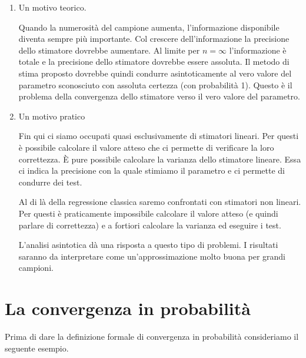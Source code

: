 \documentclass[a4paper]{report}
\newcounter{ese}
\newcounter{def}
\theoremstyle{remark}
\begin{document}
\begin{enumerate}
\item Un motivo teorico.

Quando la numerosit\`{a} del campione aumenta, l'informazione disponibile
diventa sempre pi\`{u} importante. Col crescere dell'informazione la
precisione dello stimatore dovrebbe aumentare. Al limite per $n=\infty $
l'informazione \`{e} totale e la precisione dello stimatore dovrebbe essere
assoluta. Il metodo di stima proposto dovrebbe quindi condurre
asintoticamente al vero valore del parametro sconosciuto con assoluta
certezza (con probabilit\`{a} 1). Questo \`{e} il problema della convergenza
dello stimatore verso il vero valore del parametro.

\item Un motivo pratico

Fin qui ci siamo occupati quasi esclusivamente di stimatori lineari. Per
questi \`{e} possibile calcolare il valore atteso che ci permette di
verificare la loro correttezza. \`{E} pure possibile calcolare la varianza
dello stimatore lineare. Essa ci indica la precisione con la quale stimiamo
il parametro e ci permette di condurre dei test.

Al di l\`{a} della regressione classica saremo confrontati con stimatori non
lineari. Per questi \`{e} praticamente impossibile calcolare il valore
atteso (e quindi parlare di correttezza) e a fortiori calcolare la varianza
ed eseguire i test.

L'analisi asintotica d\`{a} una risposta a questo tipo di problemi. I
risultati saranno da interpretare come un'approssimazione molto buona per
grandi campioni.
\end{enumerate}

\section{La convergenza in probabilit\`{a}}

Prima di dare la definizione formale di convergenza in probabilit\`{a}
consideriamo il seguente esempio.
\end{document}
